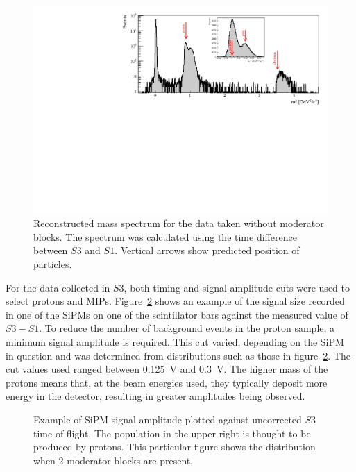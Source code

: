     \begin{figure}[h]
    \centering
    \includegraphics[width=0.9\linewidth]{files/Figures/Data_2018_8_31_b2_800MeV_0block_All.pdf}
		\caption{Reconstructed mass spectrum for the data taken without moderator blocks. The spectrum was calculated using the time difference between $S3$ and $S1$. Vertical arrows show predicted position of particles.}
		\label{fig:s3tof_mass}
	\end{figure}



    For the data collected in $S3$, both timing and signal amplitude cuts were used to select protons and MIPs.
	Figure~\ref{fig:TvsA} shows an example of the signal size recorded in one of the SiPMs on one of the scintillator bars against the measured value of $S3 - S1$.
	To reduce the number of background events in the proton sample, a minimum signal amplitude is required.
	This cut varied, depending on the SiPM in question and was determined from distributions such as those in figure~\ref{fig:TvsA}. 
	The cut values used ranged between 0.125~V and 0.3~V.
	The higher mass of the protons means that, at the beam energies used, they typically deposit more energy in the detector, resulting in greater amplitudes being observed.
	
	\begin{figure}[h]
		\begin{adjustbox}{max totalsize={.7\textwidth}, center}
			
		\end{adjustbox}
		\caption{Example of SiPM signal amplitude plotted against uncorrected $S3$ time of flight. The population in the upper right is thought to be produced by protons. This particular figure shows the distribution when 2 moderator blocks are present.}
		\label{fig:TvsA}
	\end{figure}
	